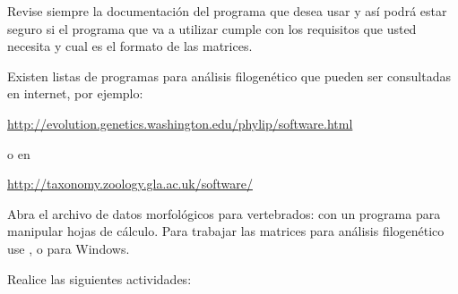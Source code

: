 Revise siempre la documentaci\'on del programa que desea usar y as\'i podr\'a estar seguro si el programa que va a utilizar cumple con los requisitos que usted necesita y cual es el formato de las matrices.

Existen listas de programas para an\'alisis filogen\'etico que pueden ser consultadas en internet, por ejemplo:


\url{http://evolution.genetics.washington.edu/phylip/software.html}
 
o en 

\url{http://taxonomy.zoology.gla.ac.uk/software/}


Abra el archivo de datos morfol\'ogicos para vertebrados:  con un programa para manipular hojas de c\'alculo. Para trabajar las matrices para an\'alisis filogen\'etico use , 
 o  para Windows.

Realice las siguientes actividades:

